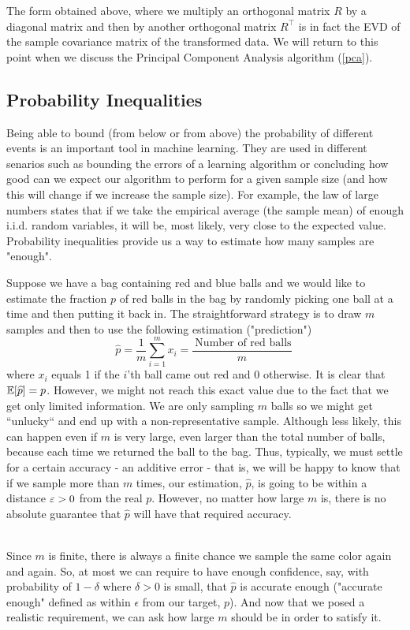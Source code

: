 \begin{remark}
The form obtained above, where we multiply an orthogonal matrix $R$ by a diagonal matrix and then by another orthogonal matrix $R^\top$ is in fact the EVD of the sample covariance matrix of the transformed data. We will return to this point when we discuss the Principal Component Analysis algorithm (\ref{pca}).
\end{remark}



\subsection{Probability Inequalities}
Being able to bound (from below or from above) the probability of different events is an important tool in machine learning. They are used in different senarios such as bounding the errors of a learning algorithm or concluding how good can we expect our algorithm to perform for a given sample size (and how this will change if we increase the sample size). For example, the law of large numbers states that if we take the empirical average (the sample mean) of enough i.i.d. random variables, it will be, most likely, very close to the expected value. Probability inequalities provide us a way to estimate how many samples are "enough".

\begin{example}
Suppose we have a bag containing red and blue balls and we would like to estimate the fraction $p$ of red balls in the bag by randomly picking one ball at a time and then putting it back in. The straightforward strategy is to draw $m$ samples and then to use the following estimation ("prediction")
\[
\widehat{p} =  \frac{1}{m}\sum_{i=1}^{m}x_i =\frac{ ~\text{Number of red balls}}{m}~
\]
where $x_i$ equals 1 if the $i$'th ball came out red and 0 otherwise. 
It is clear that $\mathbb{E} [\widehat{p}] = p$. However, we might not reach this exact value due to the fact that we get only limited information. We are only sampling $m$ balls so we might get ``unlucky`` and end up with a non-representative sample. Although less likely, this can happen even if $m$ is very large, even larger than the total number of balls, because each time we returned the ball to the bag. Thus, typically, we must settle for a certain accuracy - an additive error - that is, we will be happy to know that if we sample more than $m$ times, our estimation,  $\widehat{p}$, is going to be within a distance $\varepsilon>0$ from the real $p$. However, no matter how large $m$ is, there is no absolute guarantee that  $\widehat{p}$ will have that required accuracy.

~\\Since $m$ is finite, there is always a finite chance we sample the same color again and again.  So, at most we can require to have enough confidence, say, with probability of $1-\delta$ where $\delta>0$ is small, that $\hat{p}$ is accurate enough ("accurate enough" defined as within  $\epsilon$ from our target, $p$). And now that we posed a realistic requirement, we can ask how large $m$ should be in order  to satisfy it.
\end{example}


